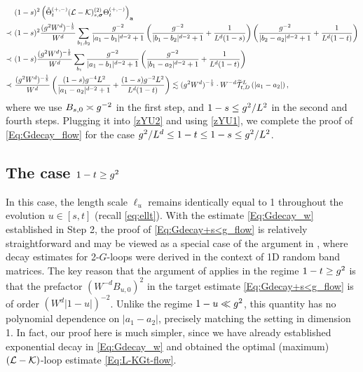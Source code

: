 \begin{align*}
    &~(1-s)^2 \left(\zTheta_t^{(+,-)} (\mathcal{L}-\mathcal{K})^{(2)}_{s,  \bsig}  \Theta_t^{(+,-)}\right)_{\ba}\\
    \prec &~  (1-s)^2 \frac{(\ilambda^2 W^{d})^{-\frac15}}{W^{d}} \sum_{b_1,b_2}\frac{\ilambda^{-2}}{|a_1-b_1|^{d-2}+1}\p{\frac{\ilambda^{-2}}{|b_1-b_2|^{d-2}+1}+\frac{1}{L^d(1-s)}} \p{ \frac{\ilambda^{-2}}{|b_2-a_2|^{d-2}+1} + \frac{1}{L^d(1-t)}}  \\
    \prec &~ (1-s) \frac{(\ilambda^2 W^{d})^{-\frac15}}{W^{d}}  \sum_{b_1}\frac{\ilambda^{-2}}{|a_1-b_1|^{d-2}+1} \left( \frac{\ilambda^{-2}}{|b_1-a_2|^{d-2}+1}+\frac{1}{L^d (1-t)}\right) \\
    \prec &~ \frac{(\ilambda^2 W^{d})^{-\frac15}}{W^{d}} \left(\frac{(1-s)\ilambda^{-4}L^2}{|a_1-a_2|^{d-2}+1}+\frac{(1-s)\ilambda^{-2}L^2}{L^{d}(1-t)}\right) \lesssim (\ilambda^2 W^{d})^{-\frac15} \cdot W^{-d}\widetilde{\mathcal{T}}_{t,D}^{L}\p{ |a_1-a_2|},
\end{align*}
where we use $B_{s,0}\asymp \ilambda^{-2}$ in the first step, and $1-s\le \ilambda^2/L^{2}$ in the second and fourth steps. Plugging it into \eqref{zYU2} and using \eqref{zYU1}, we complete the proof of \eqref{Eq:Gdecay_flow} for the case $\ilambda^2/L^{d} \leq 1-t \leq 1-s \leq \ilambda^2/L^{2}$. 

\subsection{The case \texorpdfstring{$1-t \ge \ilambda^2$}{1-t>lambda2}}\label{sec:Step5_larget}


In this case, the length scale $\ell_u$ remains identically equal to 1 throughout the evolution $u\in[s,t]$ (recall \eqref{eq:ellt}). With the estimate \eqref{Eq:Gdecay_w} established in Step 2, the proof of \eqref{Eq:Gdecay+s<g_flow} is relatively straightforward and may be viewed as a special case of the argument in \cite[Section 5.3]{YY_25}, where decay estimates for 2-$G$-loops were derived in the context of 1D random band matrices. 
The key reason that the argument of \cite{YY_25} applies in the regime $1-t \ge \ilambda^2$ is that the prefactor $(W^{-d}B_{u,0})^{2}$ in the target estimate \eqref{Eq:Gdecay+s<g_flow} is of order $(W^d|1-u|)^{-2}$. Unlike the regime $1-u\ll \ilambda^2$, this quantity has no polynomial dependence on $|a_1-a_2|$, precisely matching the setting in dimension 1. 
In fact, our proof here is much simpler, since we have already established exponential decay in \eqref{Eq:Gdecay_w} and obtained the optimal (maximum) $(\cal L - \cal K)$-loop estimate \eqref{Eq:L-KGt-flow}. 

